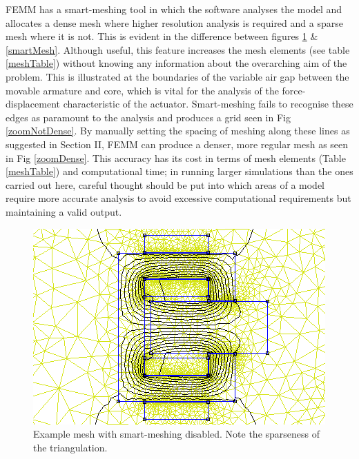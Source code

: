\documentclass[a4paper]{IEEEtran}
\begin{document}
    FEMM has a smart-meshing tool in which the software analyses the model and allocates a dense mesh where higher resolution analysis is required and a sparse mesh where it is not. This is evident in the difference between figures \ref{noSmartMesh} \& \ref{smartMesh}. Although useful, this feature increases the mesh elements (see table \ref{meshTable}) without knowing any information about the overarching aim of the problem. This is illustrated at the boundaries of the variable air gap between the movable armature and core, which is vital for the analysis of the force-displacement characteristic of the actuator. Smart-meshing fails to recognise these edges as paramount to the analysis and produces a grid seen in Fig \ref{zoomNotDense}. By manually setting the spacing of meshing along these lines as suggested in \cite{labPartB} Section II, FEMM can produce a denser, more regular mesh as seen in Fig \ref{zoomDense}. This accuracy has its cost in terms of mesh elements (Table \ref{meshTable}) and computational time; in running larger simulations than the ones carried out here, careful thought should be put into which areas of a model require more accurate analysis to avoid excessive computational requirements but maintaining a valid output.

    \begin{figure}[ht]
        \includegraphics[width = \linewidth]{Smartmesh-OFF-NotDenseAirgap.png}
        \caption{Example mesh with smart-meshing disabled. Note the sparseness of the triangulation.}
        \label{noSmartMesh} 
    \end{figure}
\end{document}
